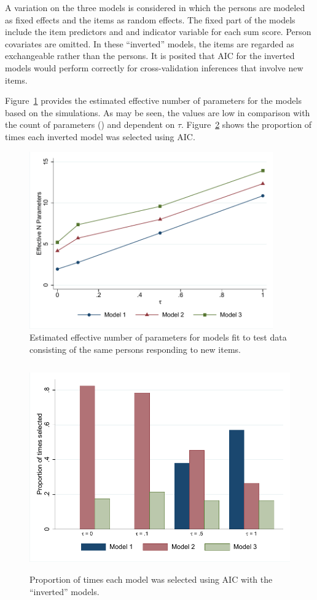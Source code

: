 \documentclass[12pt, letterpaper]{article}
\begin{document}
A variation on the three models is considered in which the persons are modeled as fixed effects and the items as random effects. The fixed part of the models include the item predictors and and indicator variable for each sum score. Person covariates are omitted. In these ``inverted'' models, the items are regarded as exchangeable rather than the persons. It is posited that AIC for the inverted models would perform correctly for cross-validation inferences that involve new items.

Figure~\ref{fig:k-new-items} provides the estimated effective number of parameters for the models based on the simulations. As may be seen, the values are low in comparison with the count of parameters (\aicitem[and]) and dependent on $\tau$. Figure~\ref{fig:select-aicitem} shows the proportion of times each inverted model was selected using AIC.

\begin{figure}[tbp]
	\centering
	\includegraphics[height=3in, trim = 1mm 1mm 1mm 1mm, clip=true]
	{chapter_2/figs/p_newitems.pdf}
	\caption{Estimated effective number of parameters for models fit to test data consisting of the same persons responding to new items.}
	\label{fig:k-new-items}
\end{figure}

\begin{figure}[tbp]
	\centering
	\includegraphics[height=3.5in, trim = 1mm 1mm 1mm 1mm, clip=true]
	{chapter_2/figs/select_aic2.pdf}
	\caption{Proportion of times each model was selected using AIC with the ``inverted'' models.}
	\label{fig:select-aicitem}
\end{figure}
\end{document}
